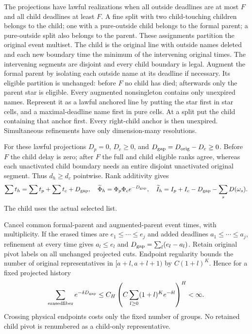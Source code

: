 The projections have lawful realizations when all outside deadlines
are at most $F$ and all child deadlines at least $F$. A fine split
with two child-touching children belongs to the child; one with a
pure-outside child belongs to the formal parent; a pure-outside split
also belongs to the parent. These assignments partition the original
event multiset. The child is the original line with outside names
deleted and each new boundary time the minimum of the intervening
original times. The intervening segments are disjoint and every child
boundary is legal. Augment the formal parent by isolating each outside
name at its deadline if necessary. Its eligible partition is unchanged:
before $F$ no child has died; afterwards only the parent star is eligible.
Every augmented nonsingleton contains only unexpired names. Represent
it as a lawful anchored line by putting the star first in star cells,
and a maximal-deadline name first in pure cells. At a split put the
child containing that anchor first. Every right-child anchor is then
unexpired. Simultaneous refinements have only dimension-many resolutions.

For these lawful projections $D_p=0$, $D_c\ge0$, and
$D_{\rm gap}=D_{\rm orig}-D_c\ge0$. Before $F$ the child delay is
zero; after $F$ the full and child eligible ranks agree, whereas each
unactivated child boundary needs an entire disjoint unactivated
original segment. Thus $d_h\ge d_c$ pointwise. Rank additivity gives
\begin{equation}
 \sum t_h=\sum t_p+\sum t_c+D_{\rm gap},\quad
 \widetilde\Phi_h=\Phi_p\Phi_c e^{-D_{\rm gap}},\quad
 \widetilde I_h=I_p+I_c-D_{\rm gap}-\sum_sD(\omega_s).
 \label{history:projection}
\end{equation}
The child uses the actual selected list.

Cancel common formal-parent and augmented-parent event times, with
multiplicity. If the erased times are $e_1\le\cdots\le e_j$ and
added deadlines $a_1\le\cdots\le a_j$, refinement at every time gives
$a_l\le e_l$ and $D_{\rm gap}=\sum_l(e_l-a_l)$. Retain original
pivot labels on all unchanged projected cuts. Endpoint regularity
bounds the number of original representatives in
$[a+l,a+l+1)$ by $C(1+l)^K$. Hence for a fixed projected history
\begin{equation}
 \sum_{\rm erased fiber}e^{-\delta D_{\rm gap}}
 \le C_H\left(C\sum_{l\ge0}(1+l)^Ke^{-\delta l}\right)^H<\infty.
 \label{history:erased-fiber}
\end{equation}
Crossing physical endpoints costs only the fixed number of groups.
No retained child pivot is renumbered as a child-only representative.

